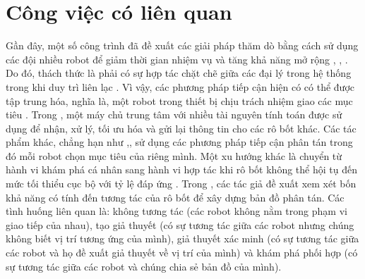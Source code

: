 \documentclass[11pt,openany]{book}
\begin{document}
\section{Công việc có liên quan}
Gần đây, một số công trình đã đề xuất các giải pháp thăm dò bằng cách sử dụng các đội nhiều robot để giảm thời gian nhiệm vụ và tăng khả năng mở rộng \cite{bautin2012strategie}, \cite{jensen2013rolling}, \cite{yan2014team}. Do đó, thách thức là phải có sự hợp tác chặt chẽ giữa các đại lý trong hệ thống trong khi duy trì liên lạc \cite{rooker2007multi}. Vì vậy, các phương pháp tiếp cận hiện có có thể được tập trung hóa, nghĩa là, một robot trong thiết bị chịu trách nhiệm giao các mục tiêu \cite{burgard2000collaborative}. Trong \cite{schmuck2017multi}, một máy chủ trung tâm với nhiều tài nguyên tính toán được sử dụng để nhận, xử lý, tối ưu hóa và gửi lại thông tin cho các rô bốt khác. Các tác phẩm khác, chẳng hạn như \cite{yuan2010cooperative},\cite{sheng2006distributed}, sử dụng các phương pháp tiếp cận phân tán trong đó mỗi robot chọn mục tiêu của riêng mình. Một xu hướng khác là chuyển từ hành vi khám phá cá nhân sang hành vi hợp tác khi rô bốt không thể hội tụ đến mức tối thiểu cục bộ với tỷ lệ đáp ứng \cite{wu2012robust}. Trong \cite{konolige2003map}, các tác giả đề xuất xem xét bốn khả năng có tính đến tương tác của rô bốt để xây dựng bản đồ phân tán. Các tình huống liên quan là: không tương tác (các robot không nằm trong phạm vi giao tiếp của nhau), tạo giả thuyết (có sự tương tác giữa các robot nhưng chúng không biết vị trí tương ứng của mình), giả thuyết xác minh (có sự tương tác giữa các robot và họ đề xuất giả thuyết về vị trí của mình) và khám phá phối hợp (có sự tương tác giữa các robot và chúng chia sẻ bản đồ của mình).
\end{document}
